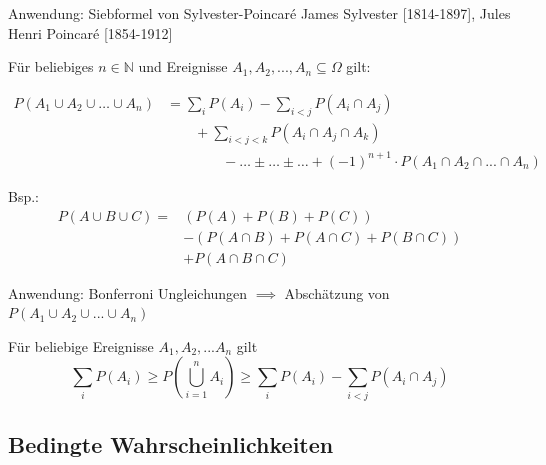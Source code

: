 \documentclass[
  10pt,
  ignorenonframetext,
]{beamer}
\begin{document}
\begin{frame}{Anwendung: Siebformel von Sylvester-Poincaré}
\label{anwendung-siebformel-von-sylvester-poincaruxe9}
James Sylvester {[}1814-1897{]}, Jules Henri Poincaré {[}1854-1912{]}

Für beliebiges \(n \in \mathbb{N}\) und Ereignisse
\(A_1, A_2,..., A_n \subseteq \Omega\) gilt:

\begin{align*}
P(A_1 \cup A_2 \cup \dots \cup A_n) & = \sum_i P(A_i) - \sum_{i < j} P(A_i \cap A_j)\\
& \qquad + \sum_{i < j < k} P(A_i \cap A_j \cap A_k)\\
& \qquad \qquad - \dots \pm \dots \pm \dots + (-1)^{n+1} \cdot P(A_1 \cap A_2 \cap ... \cap A_n)
\end{align*}

Bsp.:\\
\begin{align*}
P(A \cup B \cup C)  =& (P(A) + P(B) + P(C))  \\
                     &  - (P(A \cap B) + P(A \cap C) + P(B \cap C)) \\
                     &    + P(A \cap B \cap C)
\end{align*}
\end{frame}

\begin{frame}{Anwendung: Bonferroni Ungleichungen}
\label{anwendung-bonferroni-ungleichungen}
\(\implies\) Abschätzung von \(P(A_1 \cup A_2 \cup ... \cup A_n)\)

Für beliebige Ereignisse \(A_1, A_2, ... A_n\) gilt
\[\sum_i P(A_i) \geq P\left(\bigcup_{i=1}^n A_i\right) \geq\sum_i P(A_i) - \sum_{i<j} P(A_i \cap A_j)\]

\end{frame}

\subsection{Bedingte
Wahrscheinlichkeiten}\label{bedingte-wahrscheinlichkeiten}
\end{document}

